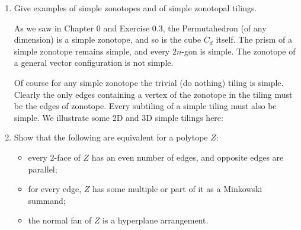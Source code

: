 \documentclass{article}
\begin{document}
\begin{enumerate}
\begin{solution}
If $3$ vectors are in the $xy$-plane and the remain 2 are not coplanar with any other vector, then we get 2 hexagonal facets and 14 square facets.

If $3$ vectors are in the $xy$-plane and the remain $2$ are coplanar with a third, then we obtain a polytope with 4 hexagonal facets and 8 square facets.

If $4$ vectors are in the $xy$-plane, we obtain the prism over a octagon.

Notably, for 6 vectors in $\mathbb{R}^3$, one configuration obtains the 3D permutahedron $\Pi_4$. The general principle for a $d$-polytope $P$ is that a set of $k$ vectors span a facet $F \subseteq P$ (and therefore a pair of facets) if and only if a hyperplane (through the origin) contains them and no other, and is spanned by them. In particular, $p$ coplanar vectors form a $2p$-gon face
\end{solution}

\item Give examples of simple zonotopes and of simple zonotopal tilings.

\begin{solution}
    As we saw in Chapter 0 and Exercise 0.3, the Permutahedron (of any dimension) is a simple zonotope, and so is the cube $C_d$ itself. The prism of a simple zonotope remains simple, and every $2n$-gon is simple. The zonotope of a general vector configuration is not simple.
    
    Of course for any simple zonotope the trivial (do nothing) tiling is simple. Clearly the only edges containing a vertex of the zonotope in the tiling must be the edges of zonotope. Every subtiling of a simple tiling must also be simple. We illustrate some 2D and 3D simple tilings here:

\end{solution}

\item Show that the following are equivalent for a polytope $Z$:

\begin{itemize}
\item every $2$-face of $Z$ has an even number of edges, and opposite edges are parallel;

\item for every edge, $Z$ has some multiple or part of it as a Minkowski summand;

\item the normal fan of $Z$ is a hyperplane arrangement.
\end{itemize}


\end{enumerate}
\end{document}
